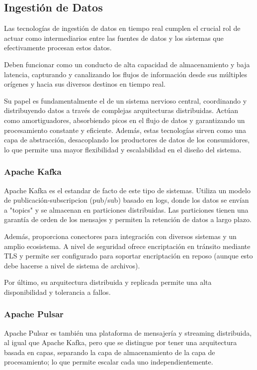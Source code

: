 \subsection{Ingestión de Datos}
Las tecnologías de ingestión de datos en tiempo real cumplen el crucial rol de actuar como intermediarios entre las fuentes de datos 
y los sistemas que efectivamente procesan estos datos. \parencite{kleppmann} 

Deben funcionar como un conducto de alta capacidad de almacenamiento y baja latencia, capturando y canalizando los flujos de información
desde sus múltiples orígenes y hacia sus diversos destinos en tiempo real. \parencite{bigdata}

Su papel es fundamentalmente el de un sistema nervioso central, coordinando y distribuyendo datos a través de complejas arquitecturas distribuidas. 
Actúan como amortiguadores, absorbiendo picos en el flujo de datos y garantizando un procesamiento constante y eficiente. 
Además, estas tecnologías sirven como una capa de abstracción, desacoplando los productores de datos de los consumidores, 
lo que permite una mayor flexibilidad y escalabilidad en el diseño del sistema. 

\subsubsection{Apache Kafka}
Apache Kafka es el estandar de facto de este tipo de sistemas. Utiliza un modelo de publicación-subscripcion (pub/sub) basado en logs, 
donde los datos se envían a "topics" y se almacenan en particiones distribuidas. Las particiones tienen una garantía de orden de los mensajes
y permiten la retención de datos a largo plazo.

Además, proporciona conectores para integración con diversos sistemas y un amplio ecosistema. A nivel de seguridad ofrece encriptación
en tránsito mediante TLS y permite ser configurado para soportar encriptación en reposo (aunque esto debe hacerse a nivel de sistema de archivos).

Por último, su arquitectura distribuida y replicada permite una alta disponibilidad y tolerancia a fallos.
\subsubsection{Apache Pulsar}
Apache Pulsar es también una plataforma de mensajería y streaming distribuida, al igual que Apache Kafka, pero que se distingue por tener una 
arquitectura basada en capas, separando la capa de almacenamiento de la capa de procesamiento; lo que permite escalar cada uno independientemente.

